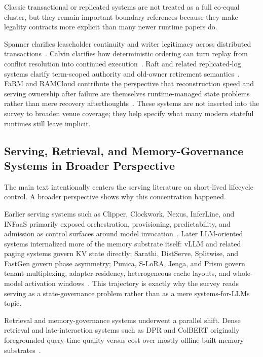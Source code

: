 Classic transactional or replicated systems are not treated as a full co-equal cluster, but they remain important boundary references because they make legality contracts more explicit than many newer runtime papers do.

Spanner clarifies leaseholder continuity and writer legitimacy across distributed transactions~\cite{corbett2012spanner}. Calvin clarifies how deterministic ordering can turn replay from conflict resolution into continued execution~\cite{thomson2012calvin}. Raft and related replicated-log systems clarify term-scoped authority and old-owner retirement semantics~\cite{ongaro2014raft}. FaRM and RAMCloud contribute the perspective that reconstruction speed and serving ownership after failure are themselves runtime-managed state problems rather than mere recovery afterthoughts~\cite{dragojevic2014farm,ousterhout2011ramcloud}. These systems are not inserted into the survey to broaden venue coverage; they help specify what many modern stateful runtimes still leave implicit.

\subsection{Serving, Retrieval, and Memory-Governance Systems in Broader Perspective}

The main text intentionally centers the serving literature on short-lived lifecycle control. A broader perspective shows why this concentration happened.

Earlier serving systems such as Clipper, Clockwork, Nexus, InferLine, and INFaaS primarily exposed orchestration, provisioning, predictability, and admission as control surfaces around model invocation~\cite{crankshaw2017clipper,gujarati2020clockwork,shen2019nexus,crankshaw2020inferline,romero2021infaas}. Later LLM-oriented systems internalized more of the memory substrate itself: vLLM and related paging systems govern KV state directly; Sarathi, DistServe, Splitwise, and FastGen govern phase asymmetry; Punica, S-LoRA, Jenga, and Prism govern tenant multiplexing, adapter residency, heterogeneous cache layouts, and whole-model activation windows~\cite{kwon2023pagedattention,agrawal2024sarathi,zhong2024distserve,patel2024splitwise,holmes2024fastgen,chen2024punica,sheng2023slora,zhang2025jenga,yu2025prism}. This trajectory is exactly why the survey reads serving as a state-governance problem rather than as a mere systems-for-LLMs topic.

Retrieval and memory-governance systems underwent a parallel shift. Dense retrieval and late-interaction systems such as DPR and ColBERT originally foregrounded query-time quality versus cost over mostly offline-built memory substrates~\cite{karpukhin2020dpr,khattab2020colbert}.

